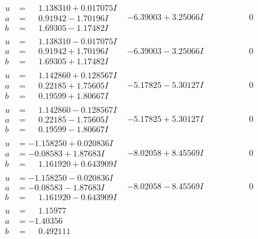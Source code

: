 \documentclass[1p]{elsarticle_modified}
\theoremstyle{definition}
\begin{document}
$$\begin{array}{c|c|c}
\begin{aligned}
u &= \phantom{-}1.138310 + 0.017075 I \\
a &= \phantom{-}0.91942 - 1.70196 I \\
b &= \phantom{-}1.69305 - 1.17482 I\end{aligned}
 & -6.39003 + 3.25066 I & \phantom{-0.000000 } 0 \\ \hline\begin{aligned}
u &= \phantom{-}1.138310 - 0.017075 I \\
a &= \phantom{-}0.91942 + 1.70196 I \\
b &= \phantom{-}1.69305 + 1.17482 I\end{aligned}
 & -6.39003 - 3.25066 I & \phantom{-0.000000 } 0 \\ \hline\begin{aligned}
u &= \phantom{-}1.142860 + 0.128567 I \\
a &= \phantom{-}0.22185 + 1.75605 I \\
b &= \phantom{-}0.19599 + 1.80667 I\end{aligned}
 & -5.17825 - 5.30127 I & \phantom{-0.000000 } 0 \\ \hline\begin{aligned}
u &= \phantom{-}1.142860 - 0.128567 I \\
a &= \phantom{-}0.22185 - 1.75605 I \\
b &= \phantom{-}0.19599 - 1.80667 I\end{aligned}
 & -5.17825 + 5.30127 I & \phantom{-0.000000 } 0 \\ \hline\begin{aligned}
u &= -1.158250 + 0.020836 I \\
a &= -0.08583 + 1.87683 I \\
b &= \phantom{-}1.161920 + 0.643909 I\end{aligned}
 & -8.02058 + 8.45569 I & \phantom{-0.000000 } 0 \\ \hline\begin{aligned}
u &= -1.158250 - 0.020836 I \\
a &= -0.08583 - 1.87683 I \\
b &= \phantom{-}1.161920 - 0.643909 I\end{aligned}
 & -8.02058 - 8.45569 I & \phantom{-0.000000 } 0 \\ \hline\begin{aligned}
u &= \phantom{-}1.15977\phantom{ +0.000000I} \\
a &= -1.40356\phantom{ +0.000000I} \\
b &= \phantom{-}0.492111\phantom{ +0.000000I}\end{aligned}

\end{array}$$
\end{document}
